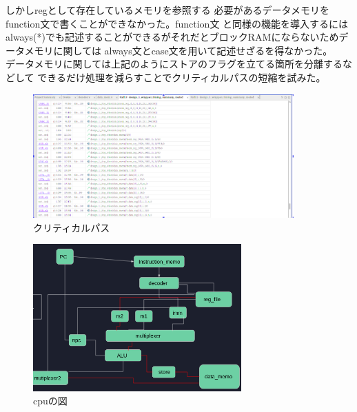 \documentclass[12pt]{jreport}
\begin{document}
  しかしregとして存在しているメモリを参照する
  必要があるデータメモリをfunction文で書くことができなかった。function文
  と同様の機能を導入するにはalways(*)でも記述することができるがそれだとブロックRAMにならないためデータメモリに関しては
  always文とcase文を用いて記述せざるを得なかった。\\
  データメモリに関しては上記のようにストアのフラグを立てる箇所を分離するなどして
  できるだけ処理を減らすことでクリティカルパスの短縮を試みた。
  



  \begin{figure}
    \centering
    \includegraphics[width=10cm]{picture/cri.png}
    \caption{クリティカルパス}
  \end{figure}





  \begin{figure}
    \centering
    \includegraphics[width=8cm]{picture/cpu.png}
    \caption{cpuの図}
  \end{figure}
  
\end{document}
